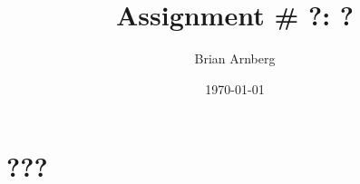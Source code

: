 \documentclass{article}
\title{Assignment \# ?: ?}
\date{\today}
\author{Brian Arnberg}
\begin{document}
\label{start}

\begin{titlepage}
	\maketitle
	\thispagestyle{empty}
\end{titlepage}


\section*{   ???   }



\label{end}
\end{document}
